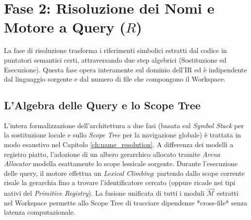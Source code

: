 \section{Fase 2: Risoluzione dei Nomi e Motore a Query ($R$)}
La fase di risoluzione trasforma i riferimenti simbolici estratti dal
codice in puntatori
semantici certi, attraversando due step algebrici (Sostituzione ed
Esecuzione). Questa fase opera interamente sul dominio dell'IR ed è
indipendente dal linguaggio sorgente e dal numero di file che
compongono il Workspace.

\subsection{L'Algebra delle Query e lo Scope Tree}
L'intera formalizzazione dell'architettura a due fasi (basata sul
  \textit{Symbol Stack} per la sostituzione locale e sullo
\textit{Scope Tree} per la navigazione globale) è trattata in
modo esaustivo nel Capitolo \ref{ch:name_resolution}.
A differenza dei modelli a registro piatto, l'adozione di un albero gerarchico allocato tramite \textit{Arena Allocator} modella esattamente lo scope lessicale sorgente. Durante l'esecuzione delle query, il motore effettua un \textit{Lexical Climbing}: partendo dallo scope corrente risale la gerarchia fino a trovare l'identificatore cercato (oppure ricade nei tipi nativi del \textit{Primitive Registry}).
La fusione
unificata di tutti i moduli $\vec{\mathcal{M}}$ estratti nel
Workspace permette allo Scope Tree di tracciare dipendenze
*cross-file* senza latenza computazionale.

